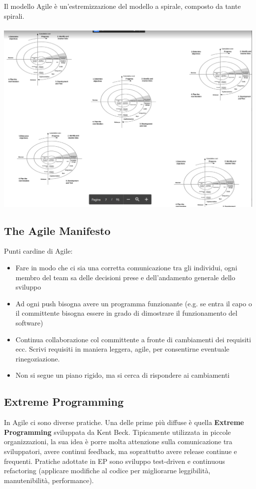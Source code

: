 \documentclass[10pt,a4paper]{book}
\begin{document}
Il modello Agile è un'estremizzazione del modello a spirale, composto da tante spirali.\\\\
\includegraphics[scale=0.2]{agile.png}\\

\subsection{The Agile Manifesto}
Punti cardine di Agile:
\begin{itemize}
\item Fare in modo che ci sia una corretta comunicazione tra gli individui, ogni membro del team sa delle decisioni prese e dell'andamento generale dello sviluppo
\item Ad ogni push bisogna avere un programma funzionante (e.g. se entra il capo o il committente bisogna essere in grado di dimostrare il funzionamento del software)
\item Continua collaborazione col committente a fronte di cambiamenti dei requisiti ecc. Scrivi requisiti in maniera leggera, agile, per consentirne eventuale rinegoziazione.
\item Non si segue un piano rigido, ma si cerca di rispondere ai cambiamenti
\end{itemize}

\subsection{Extreme Programming}
In Agile ci sono diverse pratiche. Una delle prime più diffuse è quella \textbf{Extreme Programming} sviluppata da Kent Beck. 
Tipicamente utilizzata in piccole organizzazioni, la sua idea è porre molta attenzione sulla comunicazione tra sviluppatori, avere continui feedback, ma soprattutto avere release continue e frequenti.
Pratiche adottate in EP sono sviluppo test-driven e continuous refactoring (applicare modifiche al codice per migliorarne leggibilità, manutenibilità, performance).
\end{document}
